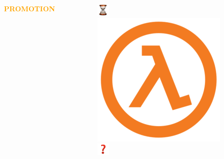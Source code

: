 \documentclass{beamer}
\begin{document}
\begin{frame}
\begin{columns}
\begin{column}{.45\textwidth}
        \LARGE{\textcolor{orange}{\textbf{PROMOTION}}} \\
        \end{column}
        \hspace{-1cm}
        \begin{column}{.25\textwidth}
        \includegraphics[width=.5\textwidth]{static/retirement.pdf} \\
        \includegraphics[width=.5\textwidth]{static/hire.pdf} \\
        \includegraphics[width=.5\textwidth]{static/promotion.pdf} \\
        \end{column}
    \end{columns}
\end{frame}
\end{document}
